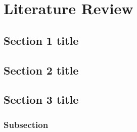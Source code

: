 \chapter{Literature Review}

\section{Section 1 title}

\section{Section 2 title}

\section{Section 3 title}

\subsection{Subsection}